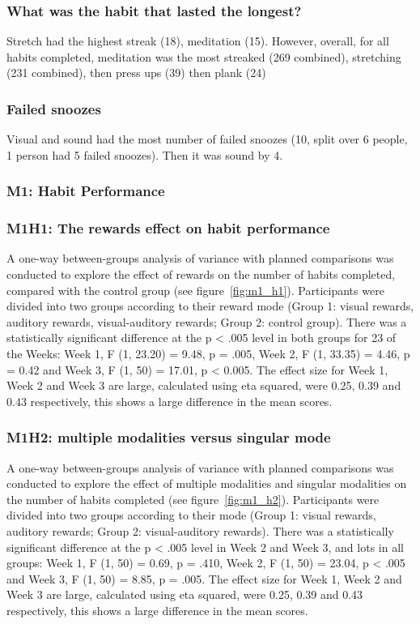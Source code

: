 \subsubsection*{What was the habit that lasted the longest?}
Stretch had the highest streak (18), meditation (15). However, overall, for all habits completed, meditation was the most streaked (269 combined), stretching (231 combined), then press ups (39) then plank (24)

\subsubsection*{Failed snoozes}
Visual and sound had the most number of failed snoozes (10, split over 6 people, 1 person had 5 failed snoozes). Then it was sound by 4.



\subsubsection{M1: Habit Performance}
\subsubsection*{M1H1: The rewards effect on habit performance}

A one-way between-groups analysis of variance with planned comparisons was conducted to explore the effect of rewards on the number of habits completed, compared with the control group (see figure~\ref{fig:m1_h1}). Participants were divided into two groups according to their reward mode (Group 1: visual rewards, auditory rewards, visual-auditory rewards; Group 2: control group). There was a statistically significant difference at the p < .005 level in both groups for 2\/3 of the Weeks: Week 1, F (1, 23.20) = 9.48, p = .005, Week 2, F (1, 33.35) = 4.46, p = 0.42 and Week 3, F (1, 50) = 17.01, p < 0.005. The effect size for Week 1, Week 2 and Week 3 are large, calculated using eta squared, were 0.25, 0.39 and 0.43 respectively, this shows a large difference in the mean scores.

\subsubsection*{M1H2: multiple modalities versus singular mode}
A one-way between-groups analysis of variance with planned comparisons was conducted to explore the effect of multiple modalities and singular modalities on the number of habits completed (see figure~\ref{fig:m1_h2}). Participants were divided into two groups according to their mode (Group 1: visual rewards, auditory rewards; Group 2: visual-auditory rewards). There was a statistically significant difference at the p < .005 level in Week 2 and Week 3, and lots in all groups: Week 1, F (1, 50) = 0.69, p = .410, Week 2, F (1, 50) = 23.04, p < .005 and Week 3, F (1, 50) = 8.85, p = .005. The effect size for Week 1, Week 2 and Week 3 are large, calculated using eta squared, were 0.25, 0.39 and 0.43 respectively, this shows a large difference in the mean scores.


